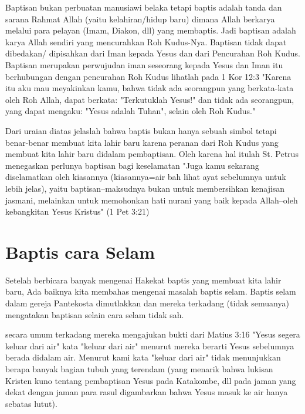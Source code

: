 Baptisan bukan perbuatan manusiawi belaka tetapi baptis adalah tanda dan sarana Rahmat Allah (yaitu kelahiran/hidup baru) dimana Allah berkarya melalui para pelayan (Imam, Diakon, dll) yang membaptis. Jadi baptisan adalah karya Allah sendiri yang mencurahkan Roh Kudus-Nya. Baptisan tidak dapat dibedakan/ dipisahkan dari Iman kepada Yesus dan dari Pencurahan Roh Kudus. Baptisan merupakan perwujudan iman seseorang kepada Yesus dan Iman itu berhubungan dengan pencurahan Roh Kudus lihatlah pada 1 Kor 12:3 "Karena itu aku mau meyakinkan kamu, bahwa tidak ada seorangpun yang berkata-kata oleh Roh Allah, dapat berkata: "Terkutuklah Yesus!" dan tidak ada seorangpun, yang dapat mengaku: "Yesus adalah Tuhan", selain oleh Roh Kudus."

Dari uraian diatas jelaslah bahwa baptis bukan hanya sebuah simbol tetapi benar-benar membuat kita lahir baru karena peranan dari Roh Kudus yang membuat kita lahir baru didalam pembaptisan. Oleh karena hal itulah St. Petrus menegaskan perlunya baptisan bagi keselamatan "Juga kamu sekarang diselamatkan oleh kiasannya (kiasannya=air bah {lihat ayat sebelumnya untuk lebih jelas}), yaitu baptisan--maksudnya bukan untuk membersihkan kenajisan jasmani, melainkan untuk memohonkan hati nurani yang baik kepada Allah--oleh kebangkitan Yesus Kristus" (1 Pet 3:21)

\section*{Baptis cara Selam}
Setelah berbicara banyak mengenai Hakekat baptis yang membuat kita lahir baru, Ada baiknya kita membahas mengenai masalah baptis selam. Baptis selam dalam gereja Pantekosta  dimutlakkan dan mereka terkadang (tidak semuanya) mengatakan baptisan selain cara selam tidak sah.

secara umum terkadang mereka mengajukan bukti dari Matius 3:16 "Yesus segera keluar dari air" kata "keluar dari air" menurut mereka berarti Yesus sebelumnya berada didalam air. Menurut kami kata "keluar dari air" tidak menunjukkan berapa banyak bagian tubuh yang terendam (yang menarik bahwa lukisan Kristen kuno tentang  pembaptisan Yesus pada Katakombe, dll pada jaman yang dekat dengan jaman para rasul digambarkan bahwa Yesus masuk ke air hanya sebatas lutut). 

